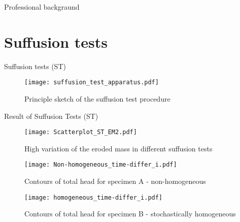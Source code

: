 \documentclass[10pt,xcolor=dvipsnames]{beamer}
\begin{document}
{\begin{frame}{Professional backgraund}
\begin{frame}
\end{frame}

\section*{Suffusion tests}


{
\usenavigationsymbolstemplate{}
\begin{frame}{Suffusion tests (ST)}
\begin{figure}[H]

   \centering
\texttt{[image: suffusion\_test\_apparatus.pdf]} 
        \caption{Principle sketch of the suffusion test procedure }
        \label{fig:suff_test_device}
\end{figure}
\end{frame}
}



\begin{frame}{Result of Suffusion Tests (ST)}


\begin{figure}
	\centering
		\texttt{[image: Scatterplot\_ST\_EM2.pdf]}
		\vspace{-0.1cm}
	\caption{High variation of the eroded mass in different suffusion tests}
	\label{fig:scatterplot_ST_EM}
\end{figure}


\end{frame}


\begin{frame}
\begin{figure} [H]
   \centering
\texttt{[image: Non-homogeneous\_time-differ\_i.pdf]} \caption{Contours of total head for specimen A - non-homogeneous}       
\end{figure}
\end{frame}

{
\usenavigationsymbolstemplate{}

%
%
\begin{frame}
\begin{figure}
   \centering
\texttt{[image: homogeneous\_time-differ\_i.pdf]} 
\caption{Contours of total head for specimen B - stochastically homogeneous}
\end{figure}
\end{frame}
}


\end{frame}}
\end{document}
